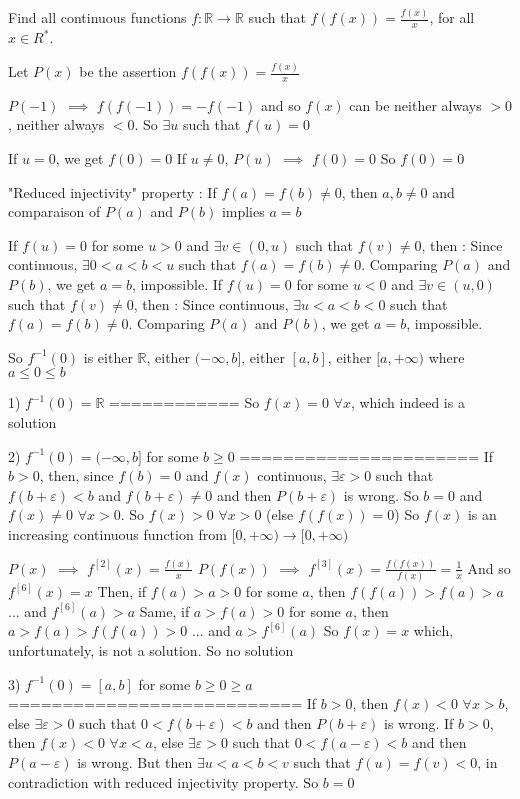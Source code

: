 \begin{solution}
	\begin{tcolorbox}Find all continuous  functions $f: \mathbb{R}\to\mathbb{R}$ such that $f(f(x))=\frac{f(x)}{x}$, for all $x{\in}R^{\ast}$.\end{tcolorbox}
Let $P(x)$ be the assertion $f(f(x))=\frac{f(x)}x$


$P(-1)$ $\implies$ $f(f(-1))=-f(-1)$ and so $f(x)$ can be neither always $>0$, neither always $<0$.
So $\exists u$ such that $f(u)=0$

If $u=0$, we get $f(0)=0$
If $u\ne 0$, $P(u)$ $\implies$ $f(0)=0$
So $f(0)=0$

"Reduced injectivity" property :
If $f(a)=f(b)\ne 0$, then $a,b\ne 0$ and comparaison of $P(a)$ and $P(b)$ implies $a=b$

If $f(u)=0$ for some $u>0$ and $\exists v\in(0,u)$ such that $f(v)\ne 0$, then :
Since continuous, $\exists 0<a<b<u$ such that $f(a)=f(b)\ne 0$.
Comparing $P(a)$ and $P(b)$, we get $a=b$, impossible.
If $f(u)=0$ for some $u<0$ and $\exists v\in(u,0)$ such that $f(v)\ne 0$, then :
Since continuous, $\exists u<a<b<0$ such that $f(a)=f(b)\ne 0$.
Comparing $P(a)$ and $P(b)$, we get $a=b$, impossible.

So $f^{-1}(0)$ is either $\mathbb R$, either $(-\infty,b]$, either $[a,b]$, either $[a,+\infty)$ where $a\le 0\le b$

1) $f^{-1}(0)=\mathbb R$
============
So $\boxed{f(x)=0}$ $\forall x$, which indeed is a solution

2) $f^{-1}(0)=(-\infty,b]$ for some $b\ge 0$
======================
If $b>0$, then, since $f(b)=0$ and $f(x)$ continuous, $\exists \varepsilon>0$ such that $f(b+\varepsilon)<b$ and $f(b+\varepsilon)\ne 0$ and then $P(b+\varepsilon)$ is wrong.
So $b=0$ and $f(x)\ne 0$ $\forall x>0$. So $f(x)>0$ $\forall x>0$ (else $f(f(x))=0$)
So $f(x)$ is an increasing continuous function from $[0,+\infty)\to[0,+\infty)$

$P(x)$ $\implies$ $f^{[2]}(x)=\frac {f(x)}x$
$P(f(x))$ $\implies$ $f^{[3]}(x)=\frac {f(f(x))}{f(x)}=\frac 1x$
And so $f^{[6]}(x)=x$
Then, if $f(a)>a>0$ for some $a$, then $f(f(a))>f(a)>a$ ... and $f^{[6]}(a)>a$
Same, if $a>f(a)>0$ for some $a$, then $a>f(a)>f(f(a))>0$ ... and $a>f^{[6]}(a)$
So $f(x)=x$ which, unfortunately, is not a solution.
So no solution

3) $f^{-1}(0)=[a,b]$ for some $b\ge 0\ge a$
===========================
If $b>0$, then $f(x)<0$ $\forall x>b$, else $\exists \varepsilon>0$ such that $0<f(b+\varepsilon)<b$ and then $P(b+\varepsilon)$ is wrong.
If $b>0$, then $f(x)<0$ $\forall x<a$, else $\exists \varepsilon>0$ such that $0<f(a-\varepsilon)<b$ and then $P(a-\varepsilon)$ is wrong.
But then  $\exists u<a<b<v$ such that $f(u)=f(v)<0$, in contradiction with reduced injectivity property.
So $b=0$


\end{solution}
